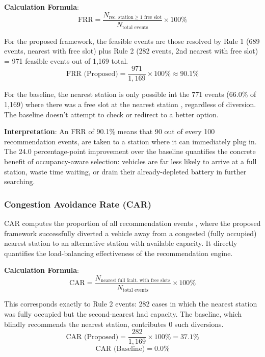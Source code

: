 \documentclass[conference]{IEEEtran}
\begin{document}
\textbf{Calculation Formula}:
\begin{equation}
  \text{FRR} =
    \frac{N_{\text{rec.\ station} \geq 1 \text{ free slot}}}
         {N_{\text{total events}}}
    \times 100\%
  \label{eq:frr}
\end{equation}

For the proposed framework, the feasible events are those resolved by
Rule 1 (689 events, nearest with free slot) plus Rule 2 (282 events,
2nd nearest with free slot) = 971 feasible events out of 1,169 total.
\begin{equation}
  \text{FRR (Proposed)} = \frac{971}{1{,}169} \times 100\% \approx 90.1\%
  \label{eq:frr_prop}
\end{equation}

For the baseline, the nearest station is only possible int the 771
events (66.0\% of 1,169) where there was a free slot at the nearest station ,
regardless of diversion. The baseline doesn't attempt to
check or redirect to a better option.

\textbf{Interpretation}: An FRR of 90.1\% means that 90 out of every 100
recommendation events, are taken to a
station where it can immediately plug in. The 24.0 percentage-point
improvement over the baseline quantifies the concrete benefit of
occupancy-aware selection: vehicles are far less likely to arrive at a
full station, waste time waiting, or drain their already-depleted
battery in further searching.

\subsubsection{Congestion Avoidance Rate (CAR)} CAR computes the proportion of all recommendation
events , where the proposed framework successfully diverted a vehicle
away from a congested (fully occupied) nearest station to an alternative
station with available capacity. It directly quantifies the
load-balancing effectiveness of the recommendation engine.

\textbf{Calculation Formula}:
\begin{equation}
  \text{CAR} =
    \frac{N_{\text{nearest full \& alt.\ with free slots}}}
         {N_{\text{total events}}}
    \times 100\%
  \label{eq:car}
\end{equation}

This corresponds exactly to Rule 2 events: 282 cases in which the
nearest station was fully occupied but the second-nearest had capacity.
The baseline, which blindly recommends the nearest station, contributes
0 such diversions.
\begin{equation}
  \text{CAR (Proposed)} = \frac{282}{1{,}169} \times 100\% = 37.1\%
  \label{eq:car_prop}
\end{equation}
\begin{equation}
  \text{CAR (Baseline)} = 0.0\%
  \label{eq:car_base}
\end{equation}
\end{document}
